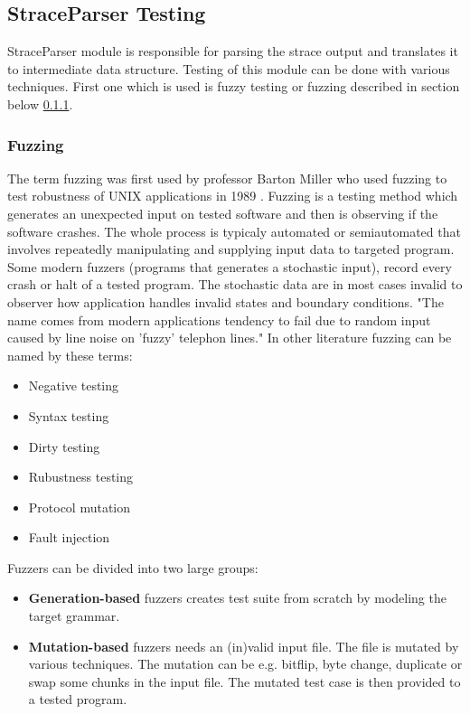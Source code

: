 \subsection{StraceParser Testing}
StraceParser module is responsible for parsing the strace output and translates
it to intermediate data structure. Testing of this module can be done with
various techniques. First one which is used is fuzzy testing or fuzzing
described in section below \ref{fuzzing}.

\subsubsection{Fuzzing}
\label{fuzzing}
The term fuzzing was first used by professor Barton Miller who used fuzzing to
test robustness of UNIX applications in 1989 \cite{Takanen:2008:FSS:1404500,
Marhefka2013}. Fuzzing is a testing method which generates an unexpected input
on tested software and then is observing if the software crashes. The whole
process is typicaly automated or semiautomated that involves repeatedly
manipulating and supplying input data to targeted program. Some modern fuzzers
(programs that generates a stochastic input), record every crash or halt of a
tested program. The stochastic data are in most cases invalid to observer how
application handles invalid states and boundary conditions. "The name comes from
modern applications tendency to fail due to random input caused by line noise on
'fuzzy' telephon lines."\cite{Takanen:2008:FSS:1404500, N2LYDLnqzEFYp0wM,
takanen2009fuzzing} In other literature fuzzing can be named by these terms:
\begin{itemize}
	\item Negative testing
	\item Syntax testing
	\item Dirty testing
	\item Rubustness testing
	\item Protocol mutation
	\item Fault injection
\end{itemize}

\noindent
Fuzzers can be divided into two large groups:

\begin{itemize}
	\item \textbf{Generation-based} fuzzers creates test suite from scratch by modeling the target grammar.
	\item \textbf{Mutation-based} fuzzers needs an (in)valid input file. The file is mutated by various techniques.
	The mutation can be e.g. bitflip, byte change, duplicate or swap some chunks in the input file.
	The mutated test case is then provided to a tested program.
\end{itemize}

